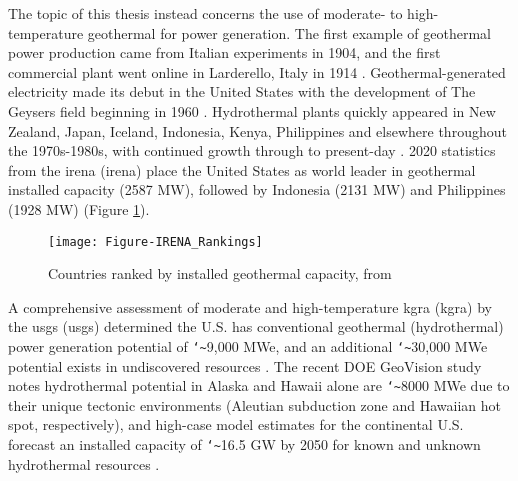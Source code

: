 The topic of this thesis instead concerns the use of moderate- to high-temperature geothermal for power generation. The first example of geothermal power production came from Italian experiments in 1904, and the first commercial plant went online in Larderello, Italy in 1914 \citep[~p. 251]{dipippo_geothermal_2012}. Geothermal-generated electricity made its debut in the United States with the development of The Geysers field beginning in 1960 \citep{tester_future_2006}. Hydrothermal plants quickly appeared in New Zealand, Japan, Iceland, Indonesia, Kenya, Philippines and elsewhere throughout the 1970s-1980s, with continued growth through to present-day \citep{lund_characteristics_2007}. 2020 statistics from the \acrlong{irena} (\acrshort{irena}) place the United States as world leader in geothermal installed capacity (2587 MW), followed by Indonesia (2131 MW) and Philippines (1928 MW) \citep{irena_country_2021} (Figure \ref{fig:irena-rank}). 

\begin{figure}[htbp]
\centering
\texttt{[image: Figure-IRENA\_Rankings]}
\caption[Country rankings, installed geothermal capacity ]{Countries ranked by installed geothermal capacity, from \protect\citep{irena_country_2021}}
\label{fig:irena-rank}
\end{figure}

A comprehensive assessment of moderate and high-temperature \acrlong{kgra} (\acrshort{kgra}) by the \acrlong{usgs} (\acrshort{usgs}) determined the U.S. has conventional geothermal (hydrothermal) power generation potential of \texttt{\char`\~}9,000 MWe, and an additional \texttt{\char`\~}30,000 MWe potential exists in undiscovered resources \citep{williams_assessment_2008}. The recent DOE GeoVision study notes hydrothermal potential in Alaska and Hawaii alone are \texttt{\char`\~}8000 MWe due to their unique tectonic environments (Aleutian subduction zone and Hawaiian hot spot, respectively), and high-case model estimates for the continental U.S. forecast an installed capacity of \texttt{\char`\~}16.5 GW by 2050 for known and unknown hydrothermal resources \citep{augustine_geovision_2019,hamm_overview_2019}.

